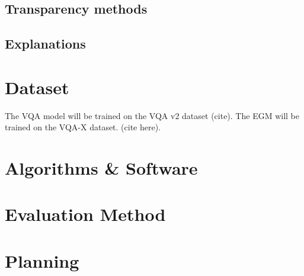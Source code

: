 \subsection{Transparency methods}



\subsection{Explanations}


\section{Dataset}
The VQA model will be trained on the VQA v2 dataset (cite). %
The EGM will be trained on the VQA-X dataset. (cite here).  %


\section{Algorithms \& Software}



\section{Evaluation Method}


\section{Planning}

